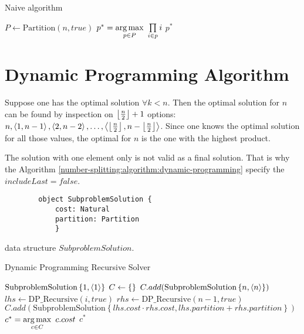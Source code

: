 \begin{algorithm}[H]
    \caption{Naive algorithm}
    \label{number-splitting:algorithm:naive-algorithm}
    \begin{algorithmic}[1]
            \State $P \gets \text{Partition}(n, true)$
            \State $p^* = \operatorname*{arg\,max}\limits_{p \in P} \ \prod\limits_{i \in p} i$
            \State \Return $p^*$
        \EndFunction
        \end{algorithmic}
\end{algorithm}

\section{Dynamic Programming Algorithm}

Suppose one has the optimal solution $\forall k < n$. Then the optimal solution for $n$ can be found by inspection on $\left\lfloor \frac{n}{2} \right\rfloor + 1$ options: $n, \left\langle 1, n-1 \right\rangle, \left\langle 2, n-2 \right\rangle, \dots, \left\langle \left\lfloor \frac{n}{2} \right\rfloor, n-\left\lfloor \frac{n}{2} \right\rfloor \right\rangle$. Since one knows the optimal solution for all those values, the optimal for $n$ is the one with the highest product.

The solution with one element only is not valid as a final solution. That is why the Algorithm \ref{number-splitting:algorithm:dynamic-programming} specify the $includeLast = false$.

\begin{algorithm}
    \begin{lstlisting}
        object SubproblemSolution {
            cost: Natural
            partition: Partition
            }
        \end{lstlisting}
        \caption{data structure $SubproblemSolution$.}
    \end{algorithm}

\newcommand{\SubproblemSolution}[2]{\text{SubproblemSolution}\left\{ #1, #2 \right\}}
\newcommand{\DP}[1]{\text{DP\_Recursive}\left( #1 \right)}

\begin{algorithm}[H]
    \caption{Dynamic Programming Recursive Solver}
    \label{number-splitting:algorithm:dynamic-programming-recursive}
    \begin{algorithmic}[1]
                \State \Return $\SubproblemSolution{1}{\tuple{1}}$
            \Else
                \State $C \gets \left\{  \right\}$
                    \State $C.add(\SubproblemSolution{n}{\tuple{n}})$
                \EndIf
                    \State $lhs \gets \DP{i, true}$
                    \State $rhs \gets \DP{n - 1, true}$
                    \State $C.add\left( \SubproblemSolution{lhs.cost \cdot rhs.cost}{lhs.partition + rhs.partition} \right)$
                \EndFor
                \State $c^* = \operatorname*{arg\,max}\limits_{c \in C} \ c.cost$
                \State \Return $c^*$
            \EndIf
        \EndFunction
        \end{algorithmic}
\end{algorithm}

